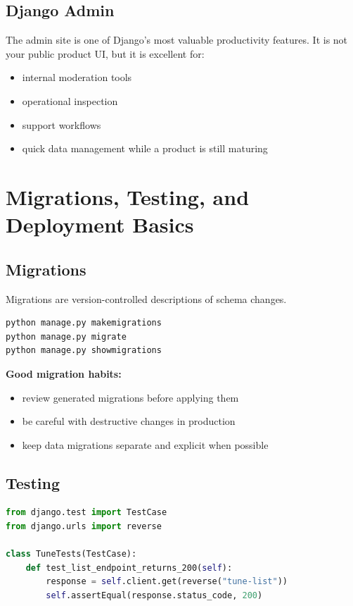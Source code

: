 \documentclass[12pt, a4paper, oneside]{book}
\begin{document}
\subsection{Django Admin}
The admin site is one of Django's most valuable productivity features. It is not your public product UI, but it is excellent for:
\begin{itemize}[leftmargin=2em]
    \item internal moderation tools
    \item operational inspection
    \item support workflows
    \item quick data management while a product is still maturing
\end{itemize}

\section{Migrations, Testing, and Deployment Basics}

\subsection{Migrations}
Migrations are version-controlled descriptions of schema changes.
\begin{lstlisting}[language=bash, caption={Migration workflow}]
python manage.py makemigrations
python manage.py migrate
python manage.py showmigrations
\end{lstlisting}

\textbf{Good migration habits:}
\begin{itemize}[leftmargin=2em]
    \item review generated migrations before applying them
    \item be careful with destructive changes in production
    \item keep data migrations separate and explicit when possible
\end{itemize}

\subsection{Testing}
\begin{lstlisting}[language=Python, caption={Simple Django test example}]
from django.test import TestCase
from django.urls import reverse

class TuneTests(TestCase):
    def test_list_endpoint_returns_200(self):
        response = self.client.get(reverse("tune-list"))
        self.assertEqual(response.status_code, 200)
\end{lstlisting}
\end{document}
